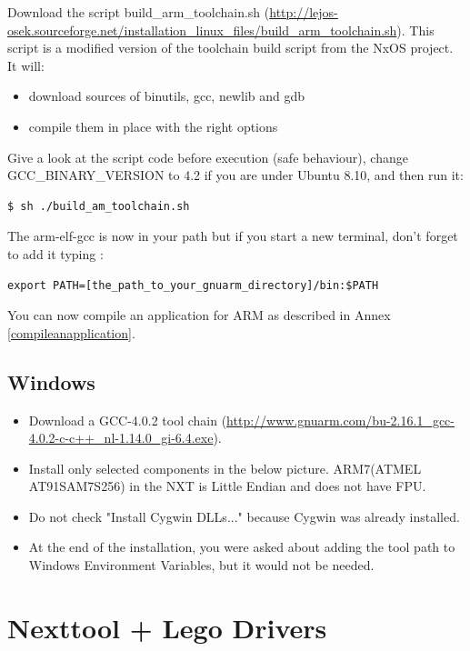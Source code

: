 Download the script build_arm_toolchain.sh (\href{http://lejos-osek.sourceforge.net/installation_linux_files/build_arm_toolchain.sh}{http://lejos-osek.sourceforge.net/installation_linux_files/build_arm_toolchain.sh}). This script is a modified version of the toolchain build script from the NxOS project. It will:
\begin{itemize}
\item download sources of binutils, gcc, newlib and gdb
\item compile them in place with the right options
\end{itemize}

Give a look at the script code before execution (safe behaviour), change GCC_BINARY_VERSION to 4.2 if you are under Ubuntu 8.10, and then run it:
\begin{verbatim}
$ sh ./build_am_toolchain.sh
\end{verbatim}

The arm-elf-gcc is now in your path but if you start a new terminal, don't forget to add it typing : 
\begin{verbatim}
export PATH=[the_path_to_your_gnuarm_directory]/bin:$PATH
\end{verbatim}

You can now compile an application for ARM as described in Annex \ref{compileanapplication}.


\subsection{Windows}
\begin{itemize}
\item Download a GCC-4.0.2 tool chain (\href{http://www.gnuarm.com/bu-2.16.1_gcc-4.0.2-c-c++_nl-1.14.0_gi-6.4.exe}{http://www.gnuarm.com/bu-2.16.1_gcc-4.0.2-c-c++_nl-1.14.0_gi-6.4.exe}).
\item Install only selected components in the below picture. ARM7(ATMEL AT91SAM7S256) in the NXT is Little Endian and does not have FPU.
\item Do not check "Install Cygwin DLLs..." because Cygwin was already installed.\\
\item At the end of the installation, you were asked about adding the tool path to Windows Environment Variables, but it would not be needed.
\end{itemize}

\section{Nexttool + Lego Drivers} \label{drivers}
